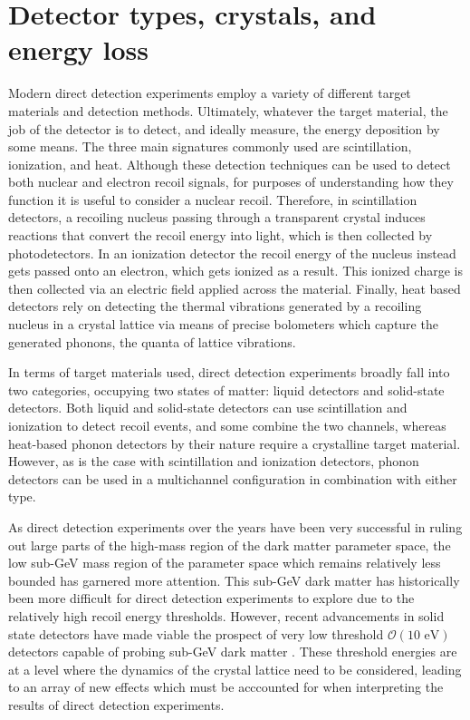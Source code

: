 \documentclass[b5paper, 10pt, twoside]{book}
\begin{document}
\chapter{Detector types, crystals, and energy loss}
\label{chap:energy-loss}

Modern direct detection experiments employ a variety of different target materials and detection methods. Ultimately, whatever the target material, the job of the detector is to detect, and ideally measure, the energy deposition by some means. The three main signatures commonly used are scintillation, ionization, and heat. Although these detection techniques can be used to detect both nuclear and electron recoil signals, for purposes of understanding how they function it is useful to consider a nuclear recoil. Therefore, in scintillation detectors, a recoiling nucleus passing through a transparent crystal induces reactions that convert the recoil energy into light, which is then collected by photodetectors. In an ionization detector the recoil energy of the nucleus instead gets passed onto an electron, which gets ionized as a result. This ionized charge is then collected via an electric field applied across the material. Finally, heat based detectors rely on detecting the thermal vibrations generated by a recoiling nucleus in a crystal lattice via means of precise bolometers which capture the generated phonons, the quanta of lattice vibrations.

In terms of target materials used, direct detection experiments broadly fall into two categories, occupying two states of matter: liquid detectors and solid-state detectors. Both liquid and solid-state detectors can use scintillation and ionization to detect recoil events, and some combine the two channels, whereas heat-based phonon detectors by their nature require a crystalline target material. However, as is the case with scintillation and ionization detectors, phonon detectors can be used in a multichannel configuration in combination with either type.

As direct detection experiments over the years have been very successful in ruling out large parts of the high-mass region of the dark matter parameter space, the low sub-GeV mass region of the parameter space which remains relatively less bounded has garnered more attention. This sub-GeV dark matter has historically been more difficult for direct detection experiments to explore due to the relatively high recoil energy thresholds. However, recent advancements in solid state detectors have made viable the prospect of very low threshold $\mathcal{O}(\text{10 eV})$ detectors capable of probing sub-GeV dark matter \parencites{RomaniEtAl2018, CrislerEtAl2018, EDELWEISS2020}. These threshold energies are at a level where the dynamics of the crystal lattice need to be considered, leading to an array of new effects which must be acccounted for when interpreting the results of direct detection experiments.
\end{document}
